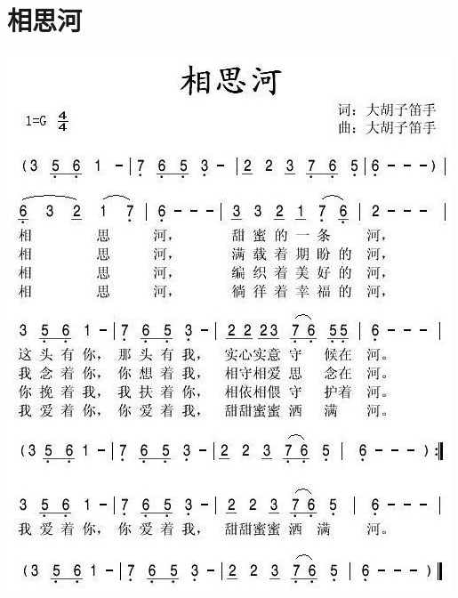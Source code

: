 \documentclass[cn,pad,twocol]{elegantbook}
\begin{document}
\section{相思河}
    \includegraphics[width=\textwidth]{dongxiao/20200901-相思河.jpeg}
\end{document}
